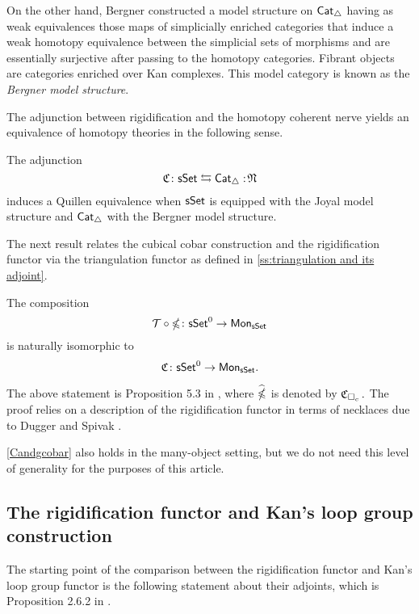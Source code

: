 On the other hand, Bergner constructed a model structure on $\mathsf{Cat}_{\triangle}$ having as weak equivalences those maps of simplicially enriched categories that induce a weak homotopy equivalence between the simplicial sets of morphisms and are essentially surjective after passing to the homotopy categories.
Fibrant objects are categories enriched over Kan complexes.
This model category is known as the \textit{Bergner model structure}.

The adjunction between rigidification and the homotopy coherent nerve yields an equivalence of homotopy theories in the following sense.

\begin{proposition} \label{joyalbergner}
	The adjunction
	$$\operatorname{\mathfrak{C}} \colon \mathsf{sSet} \leftrightarrows \mathsf{Cat}_{\triangle} :\!\operatorname{\mathfrak{N}}$$
	induces a Quillen equivalence when $\mathsf{sSet}$ is equipped with the Joyal model structure and $\mathsf{Cat}_{\triangle}$ with the Bergner model structure.
\end{proposition}

The next result relates the cubical cobar construction and the rigidification functor via the triangulation functor as defined in  \cref{ss:triangulation and its adjoint}.

\begin{proposition} \label{Candgcobar}
	The composition 
	$$\mathcal{T} \circ \operatorname{\mathbb{\Omega}} \colon \mathsf{sSet}^0 \to \mathsf{Mon}_{\mathsf{sSet}}$$
	is naturally isomorphic to
	$$\operatorname{\mathfrak{C}} \colon \mathsf{sSet}^0 \to \mathsf{Mon}_{\mathsf{sSet}}.$$
\end{proposition}

The above statement is Proposition 5.3 in \cite{rivera2018cubical}, where $\widehat{\operatorname{\mathbb{\Omega}}}$ is denoted by $\operatorname{\mathfrak{C}}_{\square_c}.$ The proof relies on a description of the rigidification functor in terms of necklaces due to Dugger and Spivak \cite{dugger2011rigidification}.

\cref{Candgcobar} also holds in the many-object setting, but we do not need this level of generality for the purposes of this article.

\subsection{The rigidification functor and Kan's loop group construction}

The starting point of the comparison between the rigidification functor and Kan's loop group functor is the following statement about their adjoints, which is Proposition 2.6.2 in \cite{hinich2007deformation}.

